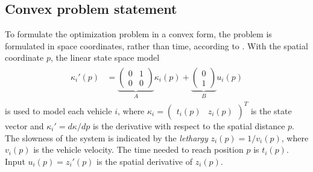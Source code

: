 \documentclass[letterpaper,10pt,conference]{ieeeconf}
\begin{document}
\subsection{Convex problem statement}
To formulate the optimization problem in a convex form, the problem is formulated in space coordinates, rather than time, according to \cite{nikolce}. With the spatial coordinate $p$, the linear state space model
\begin{align}\label{statesp}
\begin{split}
\kappa_i'(p)&=\underbrace{\begin{pmatrix}
0& 1\\
0& 0
\end{pmatrix}}_{{A}}\kappa_i(p) + \underbrace{\begin{pmatrix}
0\\
1\end{pmatrix}}_Bu_i(p)
\end{split}
\end{align}
is used to model each vehicle $i$, where $\kappa_i=\begin{pmatrix}t_i(p)& z_i(p)\end{pmatrix}^T$ is the state vector and $\kappa_i'=d\kappa/dp$ is the derivative with respect to the spatial distance $p$. The slowness of the system is indicated by the \emph{lethargy} \mbox{$z_i(p)=1/v_i(p)$}, where $v_i(p)$ is the vehicle velocity. The time needed to reach position $p$ is $t_i(p)$. Input $u_i(p)=z_i'(p)$ is the spatial derivative of $z_i(p)$.
\end{document}
